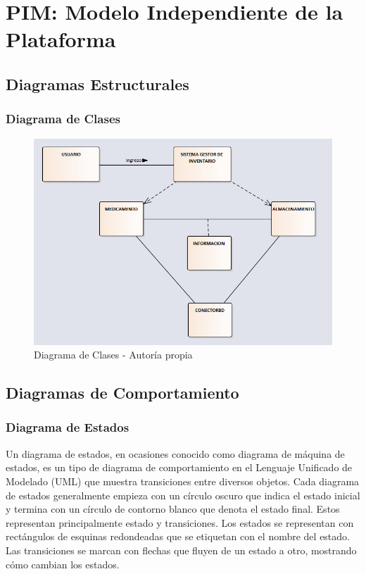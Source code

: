 \section{PIM: Modelo Independiente de la Plataforma}

\subsection{Diagramas Estructurales}

\subsubsection{Diagrama de Clases}

\begin{center}
    \begin{figure}[htb]
        \centering
        \includegraphics[width = 1.0\textwidth] {libro/capitulo5/img/Clases.PNG}
        \caption{Diagrama de Clases - Autor\'ia propia}
        \label{fig:my_label}
    \end{figure}
\end{center}

\subsection{ Diagramas de Comportamiento}
\subsubsection{ Diagrama de Estados}
Un diagrama de estados, en ocasiones conocido como diagrama de máquina de estados, es un tipo de diagrama de comportamiento en el Lenguaje Unificado de Modelado (UML) que muestra transiciones entre diversos objetos.
\newline
Cada diagrama de estados generalmente empieza con un círculo oscuro que indica el estado inicial y termina con un círculo de contorno blanco que denota el estado final. Estos representan principalmente estado y transiciones. Los estados se representan con rectángulos de esquinas redondeadas que se etiquetan con el nombre del estado. Las transiciones se marcan con flechas que fluyen de un estado a otro, mostrando cómo cambian los estados.


